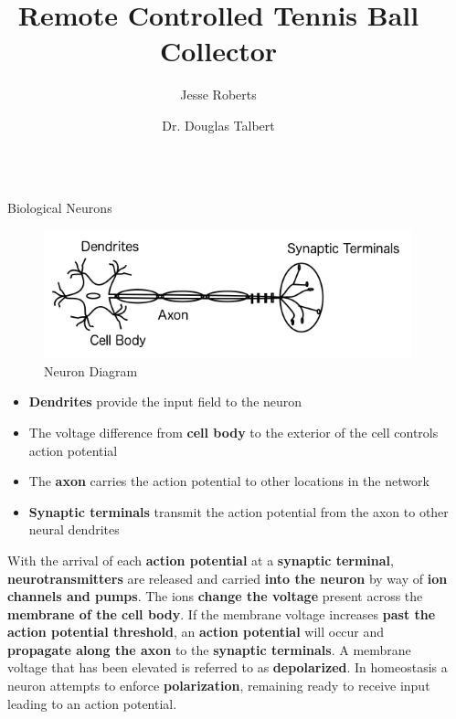 \documentclass[final]{beamer}
\title{Remote Controlled Tennis Ball Collector}
\author{Jesse Roberts \inst{1} \and Dr. Douglas Talbert \inst{2}}
\institute[shortinst]{\inst{1} Vanderbilt University \samelineand \inst{2} Tennessee Technological University}
\newlength{\sepwidth}
\newlength{\colwidth}
\newcommand{\separatorcolumn}{\begin{column}{\sepwidth}\end{column}}
\begin{document}
\begin{frame}[t]
\begin{columns}[t]
\separatorcolumn

\begin{column}{\colwidth}

  \begin{block}{Biological Neurons}

    \begin{figure}
      \centering
      \includegraphics[width=20.0cm]{Neuron.png}
      \caption{Neuron Diagram}
    \end{figure}

    \begin{itemize}
      \item \textbf{Dendrites} provide the input field to the neuron
      \item The voltage difference from \textbf{cell body} to the exterior of the cell controls action potential
      \item The \textbf{axon} carries the action potential to other locations in the network
      \item \textbf{Synaptic terminals} transmit the action potential from the axon to other neural dendrites

    \end{itemize}

    With the arrival of each \textbf{action potential} at a \textbf{synaptic terminal}, \textbf{neurotransmitters} are released and carried \textbf{into the neuron} by way of \textbf{ion channels and pumps}. The ions \textbf{change the voltage} present across the \textbf{membrane of the cell body}. If the membrane voltage increases \textbf{past the action potential threshold}, an \textbf{action potential} will occur and \textbf{propagate along the axon} to the \textbf{synaptic terminals}. A membrane voltage that has been elevated is referred to as \textbf{depolarized}. In homeostasis a neuron attempts to enforce \textbf{polarization}, remaining ready to receive input leading to an action potential. 


\end{block}
\end{column}
\end{columns}
\end{frame}
\end{document}
